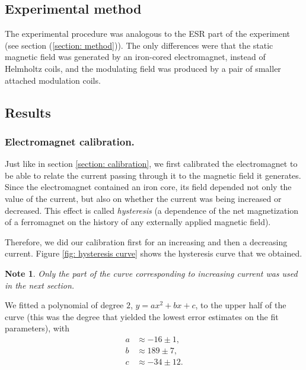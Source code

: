 \documentclass[a4paper]{jpconf}
\numberwithin{equation}{section}
\newtheorem*{note}{Note}
\begin{document}
\subsection{Experimental method}
The experimental procedure was analogous to the ESR part of the experiment (see section (\ref{section: method})). The only differences were that the static magnetic field was generated by an iron-cored electromagnet, instead of Helmholtz coils, and the modulating field was produced by a pair of smaller attached modulation coils.


\subsection{Results}
\subsubsection{Electromagnet calibration.}
Just like in section \ref{section: calibration}, we first calibrated the electromagnet to be able to relate the current passing through it to the magnetic field it generates. Since the electromagnet contained an iron core, its field depended not only the value of the current, but also on whether the current was being increased or decreased. This effect is called \emph{hysteresis} (a dependence of the net magnetization of a ferromagnet on the history of any externally applied magnetic field). 

Therefore, we did our calibration first for an increasing and then a decreasing current. Figure \ref{fig: hysteresis curve} shows the hysteresis curve that we obtained.
\begin{note}
	Only the part of the curve corresponding to increasing current was used in the next section.
\end{note}
We fitted a polynomial of degree $2$, $y = ax^2 + bx + c$, to the upper half of the curve (this was the degree that yielded the lowest error estimates on the fit parameters), with
\begin{align*}
	a &\approx -16 \pm 1, \\
	b &\approx 189 \pm 7, \\
	c &\approx -34 \pm 12.
\end{align*}

\end{document}
